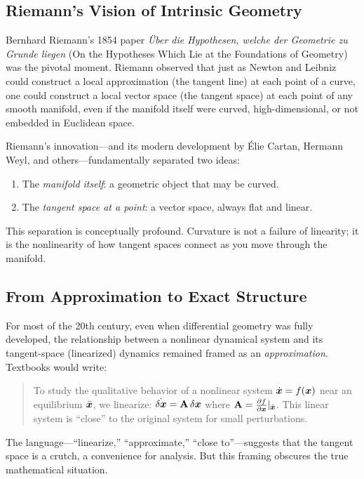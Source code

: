 \subsection{Riemann's Vision of Intrinsic Geometry}

Bernhard Riemann's 1854 paper \emph{Über die Hypothesen, welche der Geometrie zu Grunde
liegen} (On the Hypotheses Which Lie at the Foundations of Geometry) was the pivotal moment.
Riemann observed that just as Newton and Leibniz could construct a local approximation
(the tangent line) at each point of a curve, one could construct a local vector space
(the tangent space) at each point of any smooth manifold, even if the manifold itself were
curved, high-dimensional, or not embedded in Euclidean space.

Riemann's innovation---and its modern development by Élie Cartan, Hermann Weyl, and
others---fundamentally separated two ideas:
\begin{enumerate}
\item The \emph{manifold itself}: a geometric object that may be curved.
\item The \emph{tangent space at a point}: a vector space, always flat and linear.
\end{enumerate}

This separation is conceptually profound. Curvature is not a failure of linearity; it is
the nonlinearity of how tangent spaces connect as you move through the manifold.

\subsection{From Approximation to Exact Structure}

For most of the 20th century, even when differential geometry was fully developed, the
relationship between a nonlinear dynamical system and its tangent-space (linearized)
dynamics remained framed as an \emph{approximation}. Textbooks would write:
\begin{quote}
To study the qualitative behavior of a nonlinear system $\dot{\bm{x}} = f(\bm{x})$ near an
equilibrium $\bar{\bm{x}}$, we linearize: $\dot{\delta\bm{x}} = \mathbf{A}\,\delta\bm{x}$ where $\mathbf{A} = \frac{\partial f}{\partial \bm{x}}|_{\bar{\bm{x}}}$.
This linear system is ``close'' to the original system for small perturbations.
\end{quote}

The language---``linearize,'' ``approximate,'' ``close to''---suggests that the tangent
space is a crutch, a convenience for analysis. But this framing obscures the true
mathematical situation.

